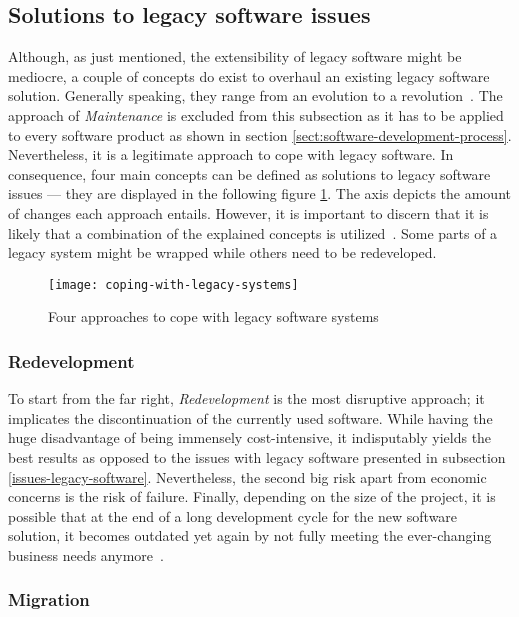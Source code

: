 \documentclass[12pt,a4paper,twoside]{report}
\begin{document}
\subsection{Solutions to legacy software issues} \label{solutions-issues-legacy-software}

Although, as just mentioned, the extensibility of legacy software might be mediocre,
a couple of concepts do exist to overhaul an existing legacy software solution.
Generally speaking, they range from an evolution to a revolution~\cite{bisbal-legacy-issues}.
The approach of \textit{Maintenance} is excluded from this subsection as it
has to be applied to every software product as shown in section \ref{sect:software-development-process}.
Nevertheless, it is a legitimate approach to cope with legacy software.
In consequence, four main concepts can be defined as solutions to legacy software issues ---
they are displayed in the following figure \ref{fig:coping-legacy}.
The axis depicts the amount of changes each approach entails.
However, it is important to discern that it is likely that a combination of
the explained concepts is utilized~\cite{bisbal-legacy-issues}.
Some parts of a legacy system might be wrapped while others need to be redeveloped.
\begin{figure}[htbp]
\centering
\texttt{[image: coping-with-legacy-systems]}
\caption{Four approaches to cope with legacy software systems~\cite{bisbal-legacy-issues}}
\label{fig:coping-legacy}
\end{figure}


\subsubsection{Redevelopment}

To start from the far right, \textit{Redevelopment} is the most disruptive approach;
it implicates the discontinuation of the currently used software.
While having the huge disadvantage of being immensely cost-intensive, it indisputably
yields the best results as opposed to the issues with legacy software presented in
subsection \ref{issues-legacy-software}.
Nevertheless, the second big risk apart from economic concerns is
the risk of failure.
Finally, depending on the size of the project, it is possible that at the end
of a long development cycle for the new software solution, it becomes outdated
yet again by not fully meeting the ever-changing
business needs anymore~\cite{stevens-software-reengineering-patterns}.


\subsubsection{Migration}
\end{document}
